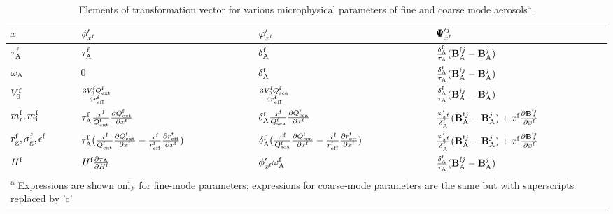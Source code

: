 \begin{table}[t]
  \centering
  \small
  \caption{Elements of transformation vector for various microphysical
parameters of fine and coarse mode aerosols\textsuperscript{a}.}
  \label{tab:jacobian2}
  \begin{tabular}{p{4em} p{10em} p{10em} p{11em} }
    \toprule
       $x$ & $\phi_{x^\text{f}}^\prime$ & $\varphi_{x^\text{f}}^\prime$ &
$\pmb{\Psi}_{x^\text{f}}^{\prime j}$ \\
    \midrule
    $\tau_\text{A}^\text{f}$ & $\tau_\text{A}^\text{f}$ & $\delta_\text{A}^\text{f}$ & 
    $\frac{\delta_\text{A}^\text{f}}{\tau_\text{A}}(\mathbf{B}_\text{A}^{\text{f}j}-\mathbf{B}_\text{A}^j)$ \\
    $\omega_\text{A}$ & 0 & $\delta_\text{A}^\text{f}$ &
    $\frac{\delta_\text{A}^\text{f}}{\tau_\text{A}}(\mathbf{B}_\text{A}^{\text{f}j}-\mathbf{B}_\text{A}^j)$ \\ 
    $V_0^\text{f}$ & $\frac{3V_0^\text{f}Q_\text{ext}^\text{f}}{4r_\text{eff}^\text{f}}$ &
    $\frac{3V_0^\text{f}Q_\text{sca}^\text{f}}{4r_\text{eff}^\text{f}}$ &
    $\frac{\delta_\text{A}^\text{f}}{\tau_\text{A}}(\mathbf{B}_\text{A}^{\text{f}j}-\mathbf{B}_\text{A}^j)$ \\ 
    $m_\text{r}^\text{f},m_\text{i}^\text{f}$ & 
    $\tau_\text{A}^\text{f}\frac{x^\text{f}}{Q_\text{ext}^\text{f}}\frac{\partial Q_\text{ext}^\text{f}}{\partial x^\text{f}}$ &
    $\delta_\text{A}^\text{f}\frac{x^\text{f}}{Q_\text{sca}^\text{f}}\frac{\partial Q_\text{sca}^\text{f}}{\partial x^\text{f}}$ & 
    $\frac{\varphi_{x^\text{f}}^\prime}{\delta_\text{A}^\text{f}}(\mathbf{B}_\text{A}^{\text{f}j}-\mathbf{B}_\text{A}^j)+x^\text{f}\frac{\partial\mathbf{B}_\text{A}^{\text{f}j}}{\partial x^\text{f}}$ \\
    $r_\text{g}^\text{f},\sigma_\text{g}^\text{f},\epsilon^\text{f}$ &
    $\tau_\text{A}^\text{f}(\frac{x^\text{f}}{Q_\text{ext}^\text{f}}\frac{\partial Q_\text{ext}^\text{f}}{\partial x^\text{f}}-\frac{x^\text{f}}{r_\text{eff}^\text{f}}\frac{\partial r_\text{eff}^\text{f}}{\partial x^\text{f}})$ & 
    $\delta_\text{A}^\text{f}(\frac{x^\text{f}}{Q_\text{sca}^\text{f}}\frac{\partial Q_\text{sca}^\text{f}}{\partial x^\text{f}}-\frac{x^\text{f}}{r_\text{eff}^\text{f}}\frac{\partial r_\text{eff}^\text{f}}{\partial x^\text{f}})$ &
    $\frac{\varphi_{x^\text{f}}^\prime}{\delta_\text{A}^\text{f}}(\mathbf{B}_\text{A}^{\text{f}j}-\mathbf{B}_\text{A}^j)+x^\text{f}\frac{\partial\mathbf{B}_\text{A}^{\text{f}j}}{\partial x^\text{f}}$ \\
    $H^\text{f}$ & $H^\text{f}\frac{\partial\tau_\mathbf{A}}{\partial{H^\text{f}}}$ &
    $\phi_{x^\text{f}}^\prime\omega_\text{A}^\text{f}$ &
    $\frac{\delta_\text{A}^\text{f}}{\tau_\text{A}}(\mathbf{B}_\text{A}^{\text{f}j}-\mathbf{B}_\text{A}^j)$ \\
    \bottomrule
    \multicolumn{4}{m{35em}}{\textsuperscript{a}
Expressions are shown only for fine-mode parameters; expressions for
coarse-mode parameters are the same but with superscripts replaced by
'c'}
  \end{tabular}
\end{table}

